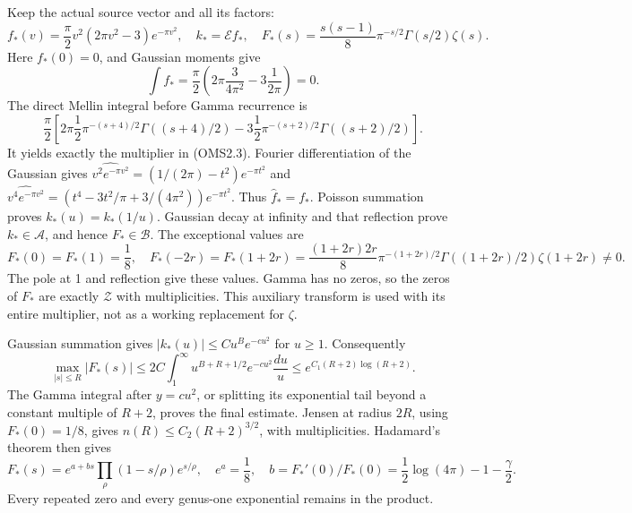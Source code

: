 Keep the actual source vector and all its factors: \[
f_*(v)=\frac\pi2v^2(2\pi v^2-3)e^{-\pi v^2},\quad
k_*=\mathcal Ef_*,\quad
F_*(s)=\frac{s(s-1)}8\pi^{-s/2}\Gamma(s/2)\zeta(s).
\tag{OMS2.3}
\] Here \(f_*(0)=0\), and Gaussian moments give \[
\int f_*=\frac\pi2\left(2\pi\frac3{4\pi^2}-3\frac1{2\pi}\right)=0.
\] The direct Mellin integral before Gamma recurrence is \[
\frac\pi2\left[
2\pi\frac12\pi^{-(s+4)/2}\Gamma((s+4)/2)
-3\frac12\pi^{-(s+2)/2}\Gamma((s+2)/2)\right].
\tag{OMS2.4}
\] It yields exactly the multiplier in (OMS2.3). Fourier differentiation
of the Gaussian gives
\(\widehat{v^2e^{-\pi v^2}}=(1/(2\pi)-t^2)e^{-\pi t^2}\) and
\(\widehat{v^4e^{-\pi v^2}}=(t^4-3t^2/\pi+3/(4\pi^2))e^{-\pi t^2}\).
Thus \(\widehat f_*=f_*\). Poisson summation proves \(k_*(u)=k_*(1/u)\).
Gaussian decay at infinity and that reflection prove
\(k_*\in\mathcal A\), and hence \(F_*\in\mathcal B\). The exceptional
values are \[
F_*(0)=F_*(1)=\frac18,\quad
F_*(-2r)=F_*(1+2r)=
\frac{(1+2r)2r}{8}\pi^{-(1+2r)/2}
\Gamma((1+2r)/2)\zeta(1+2r)\ne0.
\tag{OMS2.5}
\] The pole at 1 and reflection give these values. Gamma has no zeros,
so the zeros of \(F_*\) are exactly \(\mathcal Z\) with multiplicities.
This auxiliary transform is used with its entire multiplier, not as a
working replacement for \(\zeta\).

Gaussian summation gives \(|k_*(u)|\le Cu^B e^{-cu^2}\) for \(u\ge1\).
Consequently \[
\max_{|s|\le R}|F_*(s)|
\le2C\int_1^\infty u^{B+R+1/2}e^{-cu^2}\frac{du}{u}
\le e^{C_1(R+2)\log(R+2)}.
\tag{OMS2.6}
\] The Gamma integral after \(y=cu^2\), or splitting its exponential
tail beyond a constant multiple of \(R+2\), proves the final estimate.
Jensen at radius \(2R\), using \(F_*(0)=1/8\), gives
\(n(R)\le C_2(R+2)^{3/2}\), with multiplicities. Hadamard's theorem then
gives \[
F_*(s)=e^{a+bs}\prod_\rho(1-s/\rho)e^{s/\rho},
\quad e^a=\frac18,\quad
b=F_*'(0)/F_*(0)=\frac12\log(4\pi)-1-\frac{\gamma}{2}.
\tag{OMS2.7}
\] Every repeated zero and every genus-one exponential remains in the
product.

